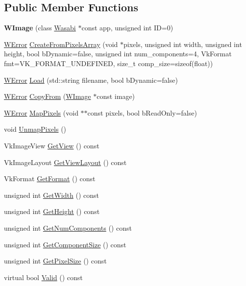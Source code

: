 \subsection*{Public Member Functions}
\begin{DoxyCompactItemize}
\item 
{\bfseries W\+Image} (class \hyperlink{class_wasabi}{Wasabi} $\ast$const app, unsigned int ID=0)\hypertarget{class_w_image_a722e42f803663d7da037d3ee176c0795}{}\label{class_w_image_a722e42f803663d7da037d3ee176c0795}

\item 
\hyperlink{class_w_error}{W\+Error} \hyperlink{class_w_image_aa862e77190c45d44bb7f85c533e2f904}{Create\+From\+Pixels\+Array} (void $\ast$pixels, unsigned int width, unsigned int height, bool b\+Dynamic=false, unsigned int num\+\_\+components=4, Vk\+Format fmt=V\+K\+\_\+\+F\+O\+R\+M\+A\+T\+\_\+\+U\+N\+D\+E\+F\+I\+N\+ED, size\+\_\+t comp\+\_\+size=sizeof(float))
\item 
\hyperlink{class_w_error}{W\+Error} \hyperlink{class_w_image_a91d1efcd67a36409078e0c272d083cd6}{Load} (std\+::string filename, bool b\+Dynamic=false)
\item 
\hyperlink{class_w_error}{W\+Error} \hyperlink{class_w_image_a86f98ef15574190d2b3a9227856793eb}{Copy\+From} (\hyperlink{class_w_image}{W\+Image} $\ast$const image)
\item 
\hyperlink{class_w_error}{W\+Error} \hyperlink{class_w_image_a70fb21d3dde372d2eabb648e66ea349e}{Map\+Pixels} (void $\ast$$\ast$const pixels, bool b\+Read\+Only=false)
\item 
void \hyperlink{class_w_image_a0b424c2a8219bf23d37affa60799ae5f}{Unmap\+Pixels} ()
\item 
Vk\+Image\+View \hyperlink{class_w_image_ab8a76f1c54255e68434fd208decb9de0}{Get\+View} () const 
\item 
Vk\+Image\+Layout \hyperlink{class_w_image_a83c63c3e4e07871efdca9f37d457e0b7}{Get\+View\+Layout} () const 
\item 
Vk\+Format \hyperlink{class_w_image_af3d5bbdb5cd50729a181fe50955ca06f}{Get\+Format} () const 
\item 
unsigned int \hyperlink{class_w_image_a651acf0e9437ba836cdddc830087a869}{Get\+Width} () const 
\item 
unsigned int \hyperlink{class_w_image_a69bfdcbe984e948e4c96af8d13a095df}{Get\+Height} () const 
\item 
unsigned int \hyperlink{class_w_image_a9783a0d2b9820ed3891be545a7fe2eea}{Get\+Num\+Components} () const 
\item 
unsigned int \hyperlink{class_w_image_a68e11d29d25b6214a5738683ca627fce}{Get\+Component\+Size} () const 
\item 
unsigned int \hyperlink{class_w_image_a3a5c549db8ccd23101c3dc484867a7bc}{Get\+Pixel\+Size} () const 
\item 
virtual bool \hyperlink{class_w_image_ac5f023d4ce03cf73888f5a9186c4771a}{Valid} () const 
\end{DoxyCompactItemize}
